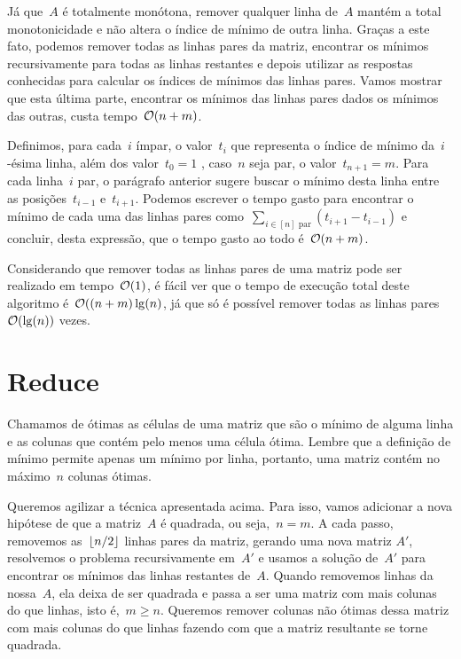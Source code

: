 Já que~$A$ é totalmente monótona, remover qualquer linha de~$A$ mantém a total monotonicidade e não altera o índice de mínimo de outra linha. Graças a este fato, podemos remover todas as linhas pares da matriz, encontrar os mínimos recursivamente para todas as linhas restantes e depois utilizar as respostas conhecidas para calcular os índices de mínimos das linhas pares. Vamos mostrar que esta última parte, encontrar os mínimos das linhas pares dados os mínimos das outras, custa tempo~$\mathcal{O}(n+m)$.

Definimos, para cada~$i$ ímpar, o valor~$t_i$ que representa o índice de mínimo da~$i$-ésima linha, além dos valor~${ t_0 = 1 }$ , caso~$n$ seja par, o valor~${ t_{n+1} = m }$. Para cada linha~$i$ par, o parágrafo anterior sugere buscar o mínimo desta linha entre as posições~$t_{i-1}$ e~$t_{i+1}$. Podemos escrever o tempo gasto para encontrar o mínimo de cada uma das linhas pares como~${ \sum\limits_{ i \in [n] \text{ par} }( t_{i+1} - t_{i-1} ) }$ e concluir, desta expressão, que o tempo gasto ao todo é~$\mathcal{O}(n+m)$. 

Considerando que remover todas as linhas pares de uma matriz pode ser realizado em tempo~$\mathcal{O}(1)$, é fácil ver que o tempo de execução total deste algoritmo é~$\mathcal{O}((n+m)\lg(n)$, já que só é possível remover todas as linhas pares~$\mathcal{O}(\lg(n))$ vezes.


\section{Reduce} \label{SMAWK:reduce}
Chamamos de ótimas as células de uma matriz que são o mínimo de alguma linha e as colunas que contém pelo menos uma célula ótima. Lembre que a definição de mínimo permite apenas um mínimo por linha, portanto, uma matriz contém no máximo~$n$ colunas ótimas.

Queremos agilizar a técnica apresentada acima. Para isso, vamos adicionar a nova hipótese de que a matriz~$A$ é quadrada, ou seja,~$n = m$. A cada passo, removemos as~$\lfloor n/2\rfloor$ linhas pares da matriz, gerando uma nova matriz $A'$, resolvemos o problema recursivamente em~$A'$ e usamos a solução de~$A'$ para encontrar os mínimos das linhas restantes de~$A$. Quando removemos linhas da nossa~$A$, ela deixa de ser quadrada e passa a ser uma matriz com mais colunas do que linhas, isto é,~$m \geq n$. Queremos remover colunas não ótimas dessa matriz com mais colunas do que linhas fazendo com que a matriz resultante se torne quadrada.  


